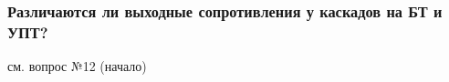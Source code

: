 \subsubsection{Различаются ли выходные сопротивления у каскадов на БТ и УПТ?}

см. вопрос №12 (начало)
